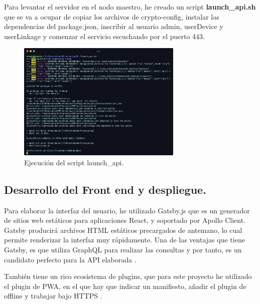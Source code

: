 \vspace{5mm}

\noindent Para levantar el servidor en el nodo maestro, he creado un script \textbf{launch\_api.sh} que se va a ocupar de 
copiar los archivos de crypto-config, instalar las dependencias del package.json, inscribir al usuario admin, userDevice y 
userLinkage y comenzar el servicio escuchando por el puerto 443. 

\begin{figure}[ht!]
  \centering
  \includegraphics[width=0.7\textwidth]{imagenes/desarrollo/comandos/launch_api}
  \caption{Ejecución del script launch\_api.}
  \label{fig:launch-api}
\end{figure}

\subsection{Desarrollo del Front end y despliegue.}

Para elaborar la interfaz del usuario, he utilizado Gatsby.js que es un generador de sitios web estáticos para 
aplicaciones React, y soportado por Apollo Client. Gatsby producirá archivos HTML estáticos precargados de antemano, 
lo cual permite renderizar la interfaz muy rápidamente. Una de las ventajas que tiene Gatsby, es que utiliza GraphQL para 
realizar las consultas y por tanto, es un candidato perfecto para la API elaborada 
\cite{react, introduction-apollo-client}.

\vspace{5mm}

\noindent También tiene un rico ecosistema de plugins, que para este proyecto he utilizado el plugin de PWA, en el que 
hay que indicar un manifiesto, añadir el plugin de offline y trabajar bajo HTTPS
\cite{progressive-web-app-gatsby, gatsby-manifest, gatsby-offline}. 

\vspace{5mm}

